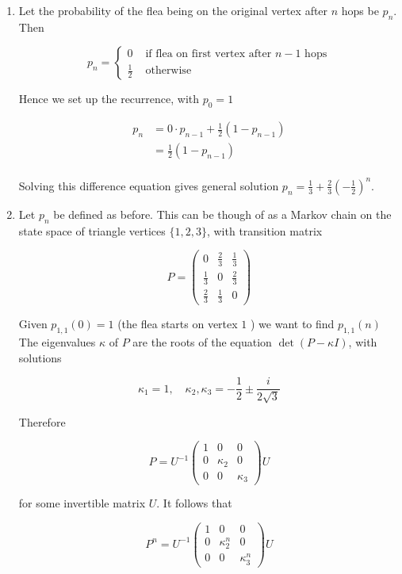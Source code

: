 \documentclass[a4paper]{article}
\begin{document}
\begin{enumerate}
	\item Let the probability of the flea being on the original vertex after $ n $ hops be $ p_{n} $. Then

\[ p_{n} = \begin{cases} 0  & \text{ if flea on first vertex after } n-1 \text{ hops}  \\ \frac{1}{2} & \text{ otherwise } \end{cases} \]

Hence we set up the recurrence, with $ p_{0} = 1 $

\begin{align*}
p_{n} & = 0 \cdot p_{n-1} + \frac{1}{2} (1 - p_{n-1})  \\
& = \frac{1}{2} (1 - p_{n-1}) \\
\end{align*}

Solving this difference equation gives general solution $ p_{n} = \frac{1}{3} + \frac{2}{3}\left( - \frac{1}{2} \right)^{n}   $.

\item Let $ p_{n} $ be defined as before. This can be though of as a Markov chain on the state space of triangle vertices $ \{1,2,3\} $, with transition matrix

\[ P = \begin{pmatrix}
0 & \frac{2}{3} & \frac{1}{3} \\
\frac{1}{3} & 0 & \frac{2}{3} \\
\frac{2}{3} & \frac{1}{3} & 0
\end{pmatrix} \]
	
Given $ p_{1,1}(0) = 1 $ (the flea starts on vertex $ 1 $ ) we want to find $ p_{1,1}(n) $ The eigenvalues $ \kappa $ of $ P $ are the roots of the equation $ \det(P - \kappa I) $, with solutions

\[ \kappa_{1} = 1, \quad \kappa_{2}, \kappa_{3} = - \frac{1}{2} \pm \frac{i}{2\sqrt{3}} \]	



Therefore

\[ P = U^{-1} \begin{pmatrix}
1 & 0 & 0 \\
0 & \kappa_{2} & 0 \\
0 & 0 & \kappa_{3}
\end{pmatrix} U \]

for some invertible matrix $ U $. It follows that

\[ P^{n} = U^{-1} \begin{pmatrix}
1 & 0 & 0 \\
0 & \kappa_{2}^{n} & 0 \\
0 & 0 & \kappa_{3}^{n}
\end{pmatrix} U  \]


\end{enumerate}
\end{document}
